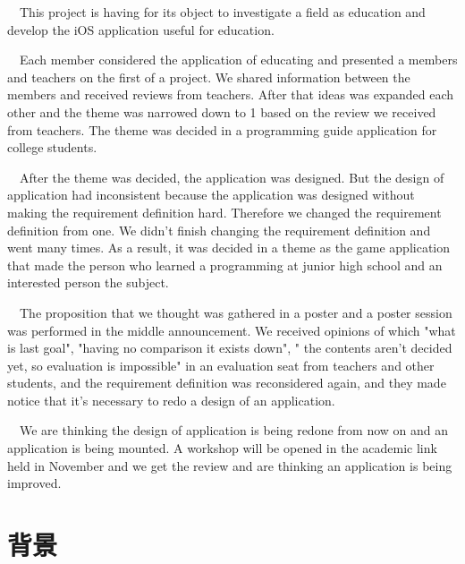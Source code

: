 \documentclass[openany,11pt,papersize]{jsbook}
\newcounter{hoge}
\newcommand{\fake}[1]{\whiledo{\thehoge<70}{#1\stepcounter{hoge}}%
  \setcounter{hoge}{0}}
\begin{document}
\begin{eabstract} 
　This project is having for its object to investigate a field as education and develop the iOS application useful for education.

　Each member considered the application of educating and presented a members and teachers on the first of a project. We shared information between the members and received reviews from teachers. After that ideas was expanded each other and the theme was narrowed down to 1 based on the review we received from teachers. The theme was decided in a programming guide application for college students.

　After the theme was decided, the application was designed. But the design of application had inconsistent because the application was designed without making the requirement definition hard. Therefore we changed the requirement definition from one. We didn't finish changing the requirement definition and went many times. As a result, it was decided in a theme as the game application that made the person who learned a programming at junior high school and an interested person the subject.

　The proposition that we thought was gathered in a poster and a poster session was performed in the middle announcement. We received opinions of which "what is last goal", "having no comparison it exists down", " the contents aren't decided yet, so evaluation is impossible" in an evaluation seat from teachers and other students, and the requirement definition was reconsidered again, and they made notice that it's necessary to redo a design of an application.

　We are thinking the design of application is being redone from now on and an application is being mounted. A workshop will be opened in the academic link held in November and we get the review and are thinking an application is being improved. 
\end{eabstract}

\tableofcontents%


\mainmatter%

\chapter{背景}
\end{document}
